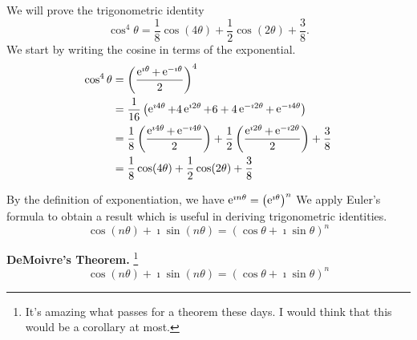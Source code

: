 \begin{Example}
  We will prove the trigonometric identity
  \[
  \cos^4 \theta = \frac{1}{8} \cos(4 \theta) +
  \frac{1}{2} \cos(2 \theta) + \frac{3}{8}.
  \]
  We start by writing the cosine in terms of the exponential.
  \begin{align*}
    \cos^4 \theta   
    &=  \left(\frac{\mathop{\mathrm{e}}\nolimits^{\imath \theta} + \mathop{\mathrm{e}}\nolimits^{-\imath \theta}}{2}\right)^4 
    \\
    &=  \frac{1}{16} \left( \mathop{\mathrm{e}}\nolimits^{\imath 4 \theta} + 4 \mathop{\mathrm{e}}\nolimits^{\imath 2 \theta} + 6 +
    4 \mathop{\mathrm{e}}\nolimits^{-\imath 2 \theta} + \mathop{\mathrm{e}}\nolimits^{-\imath 4 \theta} \right) 
    \\
    &=  \frac{1}{8} \left( \frac{\mathop{\mathrm{e}}\nolimits^{\imath 4 \theta} + \mathop{\mathrm{e}}\nolimits^{-\imath 4 \theta}}{2} \right) +
    \frac{1}{2} \left( \frac{\mathop{\mathrm{e}}\nolimits^{\imath 2 \theta} + \mathop{\mathrm{e}}\nolimits^{-\imath 2 \theta}}{2} \right) + \frac{3}{8} 
    \\
    &=  \frac{1}{8} \cos(4 \theta) + \frac{1}{2} \cos(2 \theta) + \frac{3}{8}
  \end{align*}
\end{Example}











By the definition of exponentiation, we have $\mathop{\mathrm{e}}\nolimits^{\imath n \theta} = \left( \mathop{\mathrm{e}}\nolimits^{\imath \theta} \right)^n$
We apply Euler's formula to obtain a result which is useful in deriving
trigonometric identities.
\[
\cos(n \theta) + \imath \sin(n \theta) = (\cos \theta + \imath \sin \theta)^n
\]


\begin{Result}
  \label{demoivres_theorem}
  \textbf{DeMoivre's Theorem.}%
  \footnote{It's amazing what passes for a theorem these days.  
    I would think that this would be a corollary at most.}
  \[
  \cos(n \theta) + \imath \sin(n \theta) = (\cos \theta + \imath \sin \theta)^n
  \]
\end{Result}










